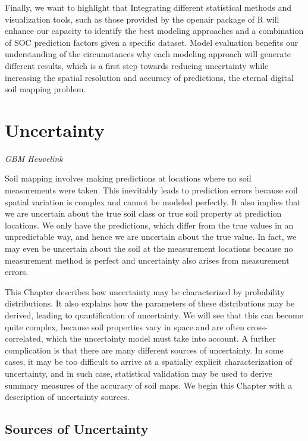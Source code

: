 \documentclass[10pt,b5paper,]{book}
\theoremstyle{definition}
\theoremstyle{definition}
\theoremstyle{definition}
\theoremstyle{remark}
\begin{document}
Finally, we want to highlight that Integrating different statistical
methods and visualization tools, such as those provided by the openair
package of R \citep{openair} will enhance our capacity to identify the
best modeling approaches and a combination of SOC prediction factors
given a specific dataset. Model evaluation benefits our understanding of
the circumstances why each modeling approach will generate different
results, which is a first step towards reducing uncertainty while
increasing the spatial resolution and accuracy of predictions, the
eternal digital soil mapping problem.

\hypertarget{uncertainty}{%
\chapter{Uncertainty}\label{uncertainty}}

\emph{GBM Heuvelink}

Soil mapping involves making predictions at locations where no soil
measurements were taken. This inevitably leads to prediction errors
because soil spatial variation is complex and cannot be modeled
perfectly. It also implies that we are uncertain about the true soil
class or true soil property at prediction locations. We only have the
predictions, which differ from the true values in an unpredictable way,
and hence we are uncertain about the true value. In fact, we may even be
uncertain about the soil at the measurement locations because no
measurement method is perfect and uncertainty also arises from
measurement errors.

This Chapter describes how uncertainty may be characterized by
probability distributions. It also explains how the parameters of these
distributions may be derived, leading to quantification of uncertainty.
We will see that this can become quite complex, because soil properties
vary in space and are often cross-correlated, which the uncertainty
model must take into account. A further complication is that there are
many different sources of uncertainty. In some cases, it may be too
difficult to arrive at a spatially explicit characterization of
uncertainty, and in such case, statistical validation may be used to
derive summary measures of the accuracy of soil maps. We begin this
Chapter with a description of uncertainty sources.

\hypertarget{sourcesuncert}{%
\section{Sources of Uncertainty}\label{sourcesuncert}}
\end{document}
